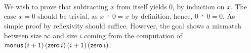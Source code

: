 \begin{code}%
\>[0]\AgdaSpace{}%
\AgdaSymbol{:}\AgdaSpace{}%
\AgdaSpace{}%
\AgdaSpace{}%
\AgdaSpace{}%
\AgdaSpace{}%
\AgdaSpace{}%
\AgdaSpace{}%
\AgdaSpace{}%
\AgdaSpace{}%
\AgdaSpace{}%
\AgdaSpace{}%
\AgdaSpace{}%
\AgdaSpace{}%
\AgdaSpace{}%
\<%
\\
\>[0]\AgdaSpace{}%
%
\>[16]%
\>[27]\AgdaSpace{}%
\AgdaFunction{+}\AgdaSpace{}%
\AgdaSymbol{)}\AgdaSpace{}%
\AgdaSymbol{(}\AgdaSpace{}%
\AgdaSymbol{)}%
\>[47]\AgdaSymbol{=}%
\>[50]\<%
\\
\>[0]\AgdaSpace{}%
\AgdaSpace{}%
\AgdaFunction{+}\AgdaSpace{}%
\AgdaSymbol{)}%
\>[16]\AgdaSymbol{(}\AgdaSpace{}%
\AgdaSymbol{)}%
\>[27]\AgdaSpace{}%
\AgdaFunction{+}\AgdaSpace{}%
\AgdaSymbol{)}\AgdaSpace{}%
\AgdaSymbol{(}\AgdaSpace{}%
\AgdaSpace{}%
\AgdaSymbol{)}%
\>[47]\AgdaSymbol{=}%
\>[50]\AgdaSpace{}%
\<%
\\
\>[0]\AgdaSpace{}%
\AgdaSpace{}%
\AgdaFunction{+}\AgdaSpace{}%
\AgdaSymbol{)}%
\>[16]\AgdaSymbol{(}\AgdaSpace{}%
\AgdaSpace{}%
\AgdaSymbol{)}%
\>[27]\AgdaSpace{}%
\AgdaFunction{+}\AgdaSpace{}%
\AgdaSymbol{)}\AgdaSpace{}%
\AgdaSymbol{(}\AgdaSpace{}%
\AgdaSpace{}%
\AgdaSymbol{)}%
\>[47]\AgdaSymbol{=}%
\>[50]\AgdaSpace{}%
\AgdaSpace{}%
\AgdaSpace{}%
\AgdaSpace{}%
\<%
\end{code}

We wish to prove that subtracting $x$ from itself yields $0$, by induction on $x$.  The case $x = 0$ should be trivial, as $x \dotminus 0 = x$ by definition, hence, $0 \dotminus 0 = 0$.  As simple proof by reflexivity should suffice.  However, the goal shows a mismatch between size $\infty$ and size $i$ coming from the computation of $\amonus\,(i + 1)\,(\azero\,i)\,(i + 1)\,(\azero\,i)$.


